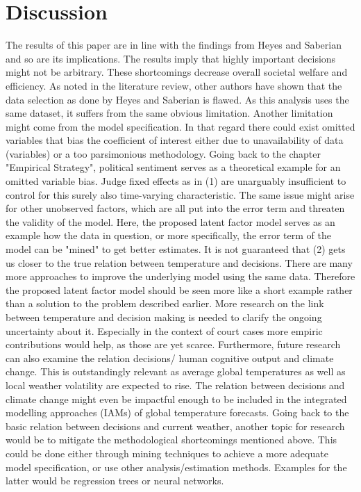 \documentclass[11pt]{article}
\begin{document}
	\section{Discussion}
	The results of this paper are in line with the findings from Heyes and Saberian and so are its implications. The results imply that highly important decisions might not be arbitrary. These shortcomings decrease overall societal welfare and efficiency.
	\newline As noted in the literature review, other authors have shown that the data selection as done by Heyes and Saberian is flawed. As this analysis uses the same dataset, it suffers from the same obvious limitation. Another limitation might come from the model specification. In that regard there could exist omitted variables that bias the coefficient of interest either due to unavailability of data (variables) or a too parsimonious methodology. Going back to the chapter "Empirical Strategy", political sentiment serves as a theoretical example for an omitted variable bias. Judge fixed effects as in (1) are unarguably insufficient to control for this surely also time-varying characteristic. The same issue might arise for other unobserved factors, which are all put into the error term and threaten the validity of the model. Here, the proposed latent factor model serves as an example how the data in question, or more specifically, the error term of the model can be "mined" to get better estimates. It is not guaranteed that (2) gets us closer to the true relation between temperature and decisions. There are many more approaches to improve the underlying model using the same data. Therefore the proposed latent factor model should be seen more like a short example rather than a solution to the problem described earlier.
	\newline More research on the link between temperature and decision making is needed to clarify the ongoing uncertainty about it. Especially in the context of court cases more empiric contributions would help, as those are yet scarce. Furthermore, future research can also examine the relation decisions/ human cognitive output and climate change. This is outstandingly relevant as average global temperatures as well as local weather volatility are expected to rise. The relation between decisions and climate change might even be impactful enough to be included in the integrated modelling approaches (IAMs) of global temperature forecasts. Going back to the basic relation between decisions and current weather, another topic for research would be to mitigate the methodological shortcomings mentioned above. This could be done either through mining techniques to achieve a more adequate model specification, or use other analysis/estimation methods. Examples for the latter would be regression trees or neural networks.
\end{document}
